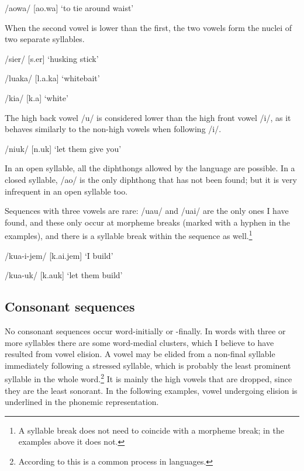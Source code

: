 /aowa/  [{{\textprimstress}ao.wa}]  `to tie around waist'

When the second vowel is lower than the first, the two vowels form the nuclei of two separate syllables. 

/sier/  [s{\textsci}.{{\textprimstress}er}]  `husking stick'

/luaka/  [l{\textupsilon}.{{\textprimstress}a.ka}]  `whitebait'

/kia/  [k{\textsci}.{{\textprimstress}a}]  `white'

The high back vowel /u/ is considered lower than the high front vowel /i/, as it behaves similarly to the non-high vowels when following /i/.

/niuk/  [n{\textsci}.{{\textprimstress}uk}]  `let them give you'

In an open syllable, all the diphthongs allowed by the language are possible. In a closed syllable, /ao/ is the only diphthong that has not been found; but it is very infrequent in an open syllable too. 

Sequences with three vowels are rare: /uau/ and /uai/ are the only ones I have found, and these only occur at morpheme breaks (marked with a hyphen in the examples), and there is a syllable break within the sequence as well.\footnote{A syllable break does not need to coincide with a morpheme break; in the examples above it does not.}  

/kua-i-jem/    [k{\textupsilon}.{{\textprimstress}}ai.jem]      `I build'

/kua-uk/      [k{\textupsilon}.{{\textprimstress}a}uk]      `let them build'

\subsection{Consonant sequences} \label{sec:2.2.3:consseq}

No consonant sequences occur word-initially or -finally. In words with three or more syllables there are some word-medial clusters, which I believe to have resulted from vowel elision.  A vowel may be elided from a non-final syllable immediately following a stressed syllable, which is probably the least prominent syllable in the whole word.\footnote{According to \citet[11]{Sommerstein1977} this is a common process in languages.} It is mainly the high vowels that are dropped, since they are the least sonorant. In the following examples, vowel undergoing elision is underlined in the phonemic representation.

